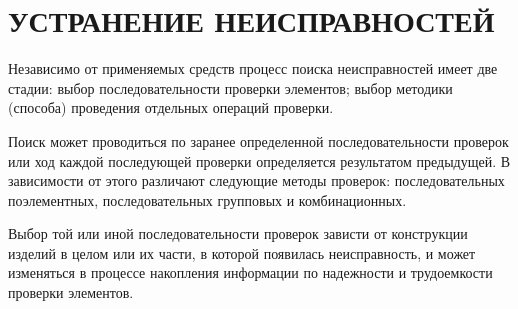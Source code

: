 \chapter*{УСТРАНЕНИЕ НЕИСПРАВНОСТЕЙ}
Независимо от применяемых средств процесс поиска неисправностей имеет две стадии: выбор последовательности проверки
элементов; выбор методики (способа) проведения отдельных операций проверки.

Поиск может проводиться по заранее определенной последовательности проверок или ход каждой последующей проверки определяется
результатом предыдущей. В зависимости от этого различают следующие методы проверок: последовательных поэлементных,
последовательных групповых и комбинационных.

Выбор той или иной последовательности проверок зависти от конструкции изделий в целом или их части, в которой появилась
неисправность, и может изменяться в процессе накопления информации по надежности и трудоемкости проверки элементов.

